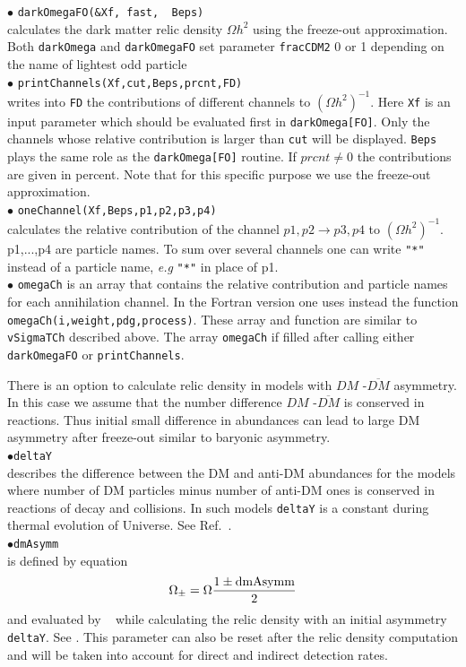 \documentclass[12pt,a4paper]{article}
\begin{document}
\noindent
$\bullet$ \verb|darkOmegaFO(&Xf, fast,  Beps)|\\
calculates the  dark matter relic density $\Omega h^2$ using the freeze-out approximation.
Both \verb|darkOmega| and \verb|darkOmegaFO| set parameter {\tt fracCDM2} 0 or 1 depending 
on the name of lightest odd particle \\
\noindent
$\bullet$ \verb|printChannels(Xf,cut,Beps,prcnt,FD)|\\   
writes into \verb|FD| the  contributions  of different channels to $(\Omega
h^2)^{-1}$. Here \verb|Xf| is an input parameter which should
be  evaluated first in \verb|darkOmega[FO]|. Only  the channels whose
relative contribution is larger than  \verb|cut| will be displayed. \verb|Beps|
plays the same role as the \verb|darkOmega[FO]| routine.
If $prcnt\ne 0$ the contributions are given in percent.
Note that  for this specific purpose  we use the
freeze-out approximation.\\
$\bullet$ \verb|oneChannel(Xf,Beps,p1,p2,p3,p4)|\\   
calculates the relative   contribution of the  channel $ p1,p2 \to p3,p4$
to $(\Omega h^2)^{-1}$. p1,...,p4 are particle names.  To 
sum over several channels one can write  \verb|"*"| instead 
of  a particle name, {\it e.g} \verb|"*"| in place of p1.\\
\noindent
$\bullet$ \verb|omegaCh| is an array that contains the relative contribution and particle names for each
annihilation channel. In the Fortran version one uses instead
the function\\
\noindent\verb|omegaCh(i,weight,pdg,process)|. These array and function
are similar to {\tt vSigmaTCh} described above. The array {\tt omegaCh} if filled after calling either
{\tt darkOmegaFO} or {\tt printChannels}. 

There is an option to calculate relic density in  models with  $DM$ -$\overline{DM}$ asymmetry.  
In this case we assume that the  number difference   $DM$ -$\overline{DM}$ is conserved in reactions.
Thus initial  small difference in abundances can lead to large DM asymmetry after freeze-out similar to baryonic
asymmetry.\\ 
\noindent
$\bullet$\verb|deltaY|\\
describes the difference between the DM and anti-DM abundances for the
models where number of DM particles minus number of anti-DM ones is conserved in
reactions of decay and collisions. In such models \verb|deltaY| is a
constant during thermal evolution of Universe.  See Ref.~\cite{Belanger:2013oya}.\\
\noindent
$\bullet$\verb|dmAsymm|\\
is defined by equation 
$$ \Omega_{\pm} = \Omega \frac{1 \pm {\rm dmAsymm}}{2}$$
and evaluated  by \micro~ while calculating the relic density  with an
initial asymmetry \verb|deltaY|. See \cite{Belanger:2013oya}. 
This parameter can also be reset  after the relic density 
computation and will be taken into account for direct and 
indirect detection rates.
\end{document}
